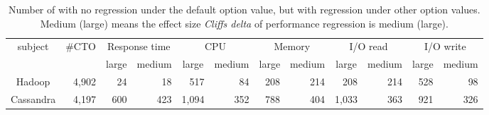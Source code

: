 \begin{table}[t]
\tabcolsep=0.04cm
\caption{Number of \instance with no regression under the default option value, but with regression under other option values. Medium (large) means the effect size \emph{Cliff\textquotesingle s delta} of performance regression is medium (large).} %
    \begin{tabular}{|c|c|c|r|c|r|c|r|c|r|c|r|}
    \hline
    \multirow{2}{*}{subject} & \multirow{2}{*}{\#CTO}    & \multicolumn{2}{c|}{Response time}    & \multicolumn{2}{c|}{CPU}               & \multicolumn{2}{c|}{Memory}           & \multicolumn{2}{c|}{I/O read}          & \multicolumn{2}{c|}{I/O write}         \\ \cline{3-12} 
            &          & large   & \multicolumn{1}{c|}{medium} & large    & \multicolumn{1}{c|}{medium} & large   & \multicolumn{1}{c|}{medium} & large    & \multicolumn{1}{c|}{medium} & large    & \multicolumn{1}{c|}{medium} \\ \hline
    Hadoop  & \multicolumn{1}{r|}{4,902} & \multicolumn{1}{r|}{24}  & 18         & \multicolumn{1}{r|}{517}  & 84         & \multicolumn{1}{r|}{208} & 214        & \multicolumn{1}{r|}{208}  & 214        & \multicolumn{1}{r|}{528}  & 98         \\ \hline
    Cassandra                & \multicolumn{1}{r|}{4,197} & \multicolumn{1}{r|}{600} & 423        & \multicolumn{1}{r|}{1,094} & 352        & \multicolumn{1}{r|}{788} & 404        & \multicolumn{1}{r|}{1,033} & 363        & \multicolumn{1}{r|}{921} & 326        \\ \hline
    \end{tabular}
\label{tab:option_regression}
\end{table}

